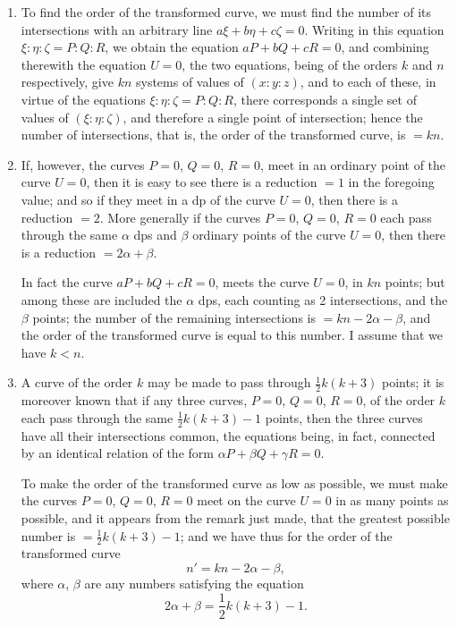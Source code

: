 \documentclass[12pt,a4paper]{article}
\theoremstyle{plain}
\theoremstyle{definition}
\theoremstyle{remark}
\begin{document}
\begin{enumerate}[label=\arabic*.]
\item To find the order of the transformed curve, we must find the number of its intersections with an arbitrary line $a\xi + b\eta + c\zeta = 0$. Writing in this equation $\xi:\eta:\zeta = P:Q:R$, we obtain the equation $aP + bQ + cR = 0$, and combining therewith the equation $U = 0$, the two equations, being of the orders $k$ and $n$ respectively, give $kn$ systems of values of $(x:y:z)$, and to each of these, in virtue of the equations $\xi:\eta:\zeta = P:Q:R$, there corresponds a single set of values of $(\xi:\eta:\zeta)$, and therefore a single point of intersection; hence the number of intersections, that is, the order of the transformed curve, is $= kn$.

\item If, however, the curves $P = 0$, $Q = 0$, $R = 0$, meet in an ordinary point of the curve $U = 0$, then it is easy to see there is a reduction $= 1$ in the foregoing value; and so if they meet in a dp of the curve $U = 0$, then there is a reduction $= 2$. More generally if the curves $P = 0$, $Q = 0$, $R = 0$ each pass through the same $\alpha$ dps and $\beta$ ordinary points of the curve $U = 0$, then there is a reduction $= 2\alpha + \beta$.

In fact the curve $aP + bQ + cR = 0$, meets the curve $U = 0$, in $kn$ points; but among these are included the $\alpha$ dps, each counting as 2 intersections, and the $\beta$ points; the number of the remaining intersections is $= kn - 2\alpha - \beta$, and the order of the transformed curve is equal to this number. I assume that we have $k < n$.

\item A curve of the order $k$ may be made to pass through $\frac{1}{2}k(k+3)$ points; it is moreover known that if any three curves, $P = 0$, $Q = 0$, $R = 0$, of the order $k$ each pass through the same $\frac{1}{2}k(k+3) - 1$ points, then the three curves have all their intersections common, the equations being, in fact, connected by an identical relation of the form $\alpha P + \beta Q + \gamma R = 0$.

To make the order of the transformed curve as low as possible, we must make the curves $P = 0$, $Q = 0$, $R = 0$ meet on the curve $U = 0$ in as many points as possible, and it appears from the remark just made, that the greatest possible number is $= \frac{1}{2}k(k+3) - 1$; and we have thus for the order of the transformed curve
\[n' = kn - 2\alpha - \beta,\]
where $\alpha$, $\beta$ are any numbers satisfying the equation
\[2\alpha + \beta = \frac{1}{2}k(k+3) - 1.\]


\end{enumerate}
\end{document}
